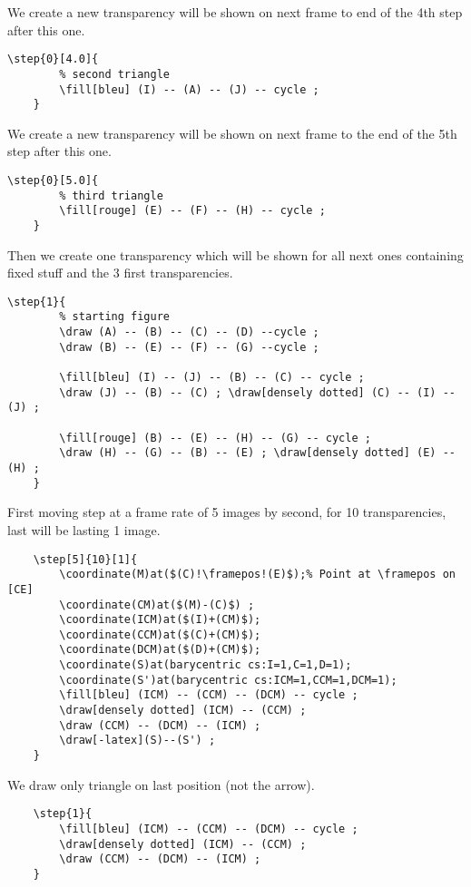 \documentclass[a4paper,12pt]{article}
\begin{document}
We create a new transparency will be shown on next frame to end of the 4th step after this one.

\begin{lstlisting}[name=exemplecomplet]
	\step{0}[4.0]{
		% second triangle
		\fill[bleu] (I) -- (A) -- (J) -- cycle ;
	}
\end{lstlisting}

We create a new transparency will be shown on next frame to the end of the 5th step after this one.

\begin{lstlisting}[name=exemplecomplet]
	\step{0}[5.0]{
		% third triangle
		\fill[rouge] (E) -- (F) -- (H) -- cycle ;
	}
\end{lstlisting}

Then we create one transparency which will be shown for all next ones containing fixed stuff and the 3 first transparencies.

\begin{lstlisting}[name=exemplecomplet]
	\step{1}{
		% starting figure
		\draw (A) -- (B) -- (C) -- (D) --cycle ;
		\draw (B) -- (E) -- (F) -- (G) --cycle ;
		
		\fill[bleu] (I) -- (J) -- (B) -- (C) -- cycle ;
		\draw (J) -- (B) -- (C) ; \draw[densely dotted] (C) -- (I) -- (J) ;
			
		\fill[rouge] (B) -- (E) -- (H) -- (G) -- cycle ;
		\draw (H) -- (G) -- (B) -- (E) ; \draw[densely dotted] (E) -- (H) ;
	}
\end{lstlisting}

First moving step at a frame rate of 5 images by second, for 10 transparencies, last will be lasting 1 image.

\begin{lstlisting}[name=exemplecomplet]
	% first triangle moves :
	\step[5]{10}[1]{
		\coordinate(M)at($(C)!\framepos!(E)$);% Point at \framepos on [CE]
		\coordinate(CM)at($(M)-(C)$) ;
		\coordinate(ICM)at($(I)+(CM)$);
		\coordinate(CCM)at($(C)+(CM)$);
		\coordinate(DCM)at($(D)+(CM)$);
		\coordinate(S)at(barycentric cs:I=1,C=1,D=1);
		\coordinate(S')at(barycentric cs:ICM=1,CCM=1,DCM=1);
		\fill[bleu] (ICM) -- (CCM) -- (DCM) -- cycle ;
		\draw[densely dotted] (ICM) -- (CCM) ;
		\draw (CCM) -- (DCM) -- (ICM) ;
		\draw[-latex](S)--(S') ;
	}
\end{lstlisting}

We draw only triangle on last position (not the arrow).

\begin{lstlisting}[name=exemplecomplet]
	% final postion
	\step{1}{
		\fill[bleu] (ICM) -- (CCM) -- (DCM) -- cycle ;
		\draw[densely dotted] (ICM) -- (CCM) ;
		\draw (CCM) -- (DCM) -- (ICM) ;
	}
\end{lstlisting}
\end{document}
